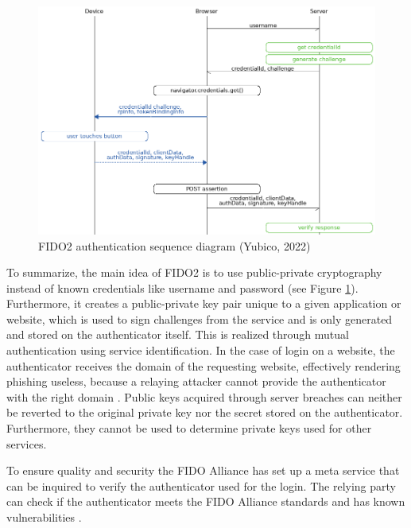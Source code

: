 \documentclass[runningheads]{llncs}
\begin{document}
\begin{figure}[h]\label{figure_one}
  \centering
  \includegraphics[width=\textwidth]{references/fido_flow_by_yubico.png}
  \caption{FIDO2 authentication sequence diagram (Yubico, 2022)}
\end{figure}

To summarize, the main idea of FIDO2 is to use public-private cryptography instead of known credentials like username and password (see Figure \ref{figure_one}). Furthermore, it creates a public-private key pair unique to a given application or website, which is used to sign challenges from the service and is only generated and stored on the authenticator itself. This is realized through mutual authentication using service identification. In the case of login on a website, the authenticator receives the domain of the requesting website, effectively rendering phishing useless, because a relaying attacker cannot provide the authenticator with the right domain \cite{274610}. Public keys acquired through server breaches can neither be reverted to the original private key nor the secret stored on the authenticator. Furthermore, they cannot be used to determine private keys used for other services.

To ensure quality and security the FIDO Alliance has set up a meta service that can be inquired to verify the authenticator used for the login. The relying party can check if the authenticator meets the FIDO Alliance standards and has known vulnerabilities \cite{9099190}.
\end{document}
